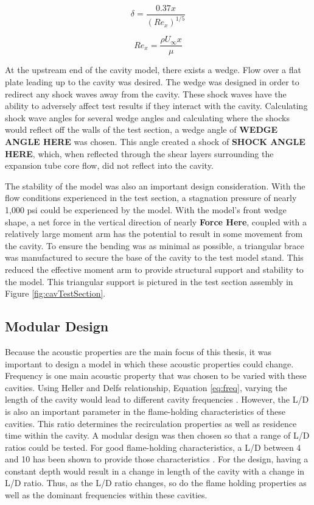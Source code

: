 \begin{equation}
\delta = \frac{0.37x}{(Re_x)^{1/5}}
\label{eq:BL}
\end{equation}

\begin{equation}
Re_x = \frac{\rho U_\infty x}{\mu}
\label{eq:Re}
\end{equation}

At the upstream end of the cavity model, there exists a wedge. Flow over a flat plate leading up to the cavity was desired. The wedge was designed in order to redirect any shock waves away from the cavity. These shock waves have the ability to adversely affect test results if they interact with the cavity. Calculating shock wave angles for several wedge angles and calculating where the shocks would reflect off the walls of the test section, a wedge angle of \textbf{WEDGE ANGLE HERE} was chosen. This angle created a shock of \textbf{SHOCK ANGLE HERE}, which, when reflected through the shear layers surrounding the expansion tube core flow, did not reflect into the cavity.

The stability of the model was also an important design consideration. With the flow conditions experienced in the test section, a stagnation pressure of nearly 1,000 psi could be experienced by the model. With the model's front wedge shape, a net force in the vertical direction of nearly \textbf{Force Here}, coupled with a relatively large moment arm has the potential to result in some movement from the cavity. To ensure the bending was as minimal as possible, a triangular brace was manufactured to secure the base of the cavity to the test model stand. This reduced the effective moment arm to provide structural support and stability to the model. This triangular support is pictured in the test section assembly in Figure \ref{fig:cavTestSection}.


\subsection{Modular Design}

Because the acoustic properties are the main focus of this thesis, it was important to design a model in which these acoustic properties could change. Frequency is one main acoustic property that was chosen to be varied with these cavities. Using Heller and Delfs relationship, Equation \ref{eq:freq}, varying the length of the cavity would lead to different cavity frequencies \cite{heller1996letter}. However, the L/D is also an important parameter in the flame-holding characteristics of these cavities. This ratio determines the recirculation properties as well as residence time within the cavity. A modular design was then chosen so that a range of L/D ratios could be tested. For good flame-holding characteristics, a L/D between 4 and 10 has been shown to provide those characteristics \cite{ben2001cavity}. For the design, having a constant depth would result in a change in length of the cavity with a change in L/D ratio. Thus, as the L/D ratio changes, so do the flame holding properties as well as the dominant frequencies within these cavities. 

